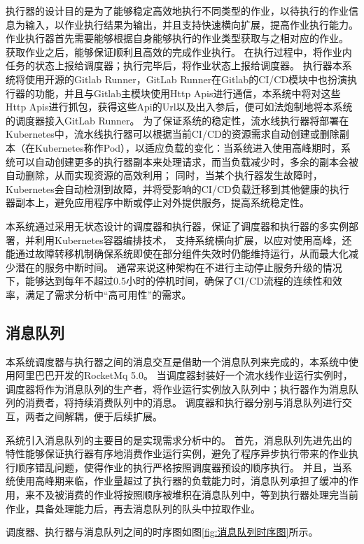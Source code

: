 执行器的设计目的是为了能够稳定高效地执行不同类型的作业，以待执行的作业信息为输入，以作业执行结果为输出，并且支持快速横向扩展，提高作业执行能力。
作业执行器首先需要能够根据自身能够执行的作业类型获取与之相对应的作业。
获取作业之后，能够保证顺利且高效的完成作业执行。
在执行过程中，将作业内任务的状态上报给调度器；执行完毕后，将作业状态上报给调度器。
执行器本系统将使用开源的Gitlab Runner，GitLab Runner在Gitlab的CI/CD模块中也扮演执行器的功能，并且与Gitlab主模块使用Http Apis进行通信，本系统中将对这些Http Apis进行抓包，获得这些Api的Url以及出入参后，便可如法炮制地将本系统的调度器接入GitLab Runner。
为了保证系统的稳定性，流水线执行器将部署在Kubernetes中，流水线执行器可以根据当前CI/CD的资源需求自动创建或删除副本（在Kubernetes称作Pod），以适应负载的变化：当系统进入使用高峰期时，系统可以自动创建更多的执行器副本来处理请求，而当负载减少时，多余的副本会被自动删除，从而实现资源的高效利用；
同时，当某个执行器发生故障时，Kubernetes会自动检测到故障，并将受影响的CI/CD负载迁移到其他健康的执行器副本上，避免应用程序中断或停止对外提供服务，提高系统稳定性。

本系统通过采用无状态设计的调度器和执行器，保证了调度器和执行器的多实例部署，并利用Kubernetes容器编排技术，
支持系统横向扩展，以应对使用高峰，还能通过故障转移机制确保系统即使在部分组件失效时仍能维持运行，从而最大化减少潜在的服务中断时间。
通常来说这种架构在不进行主动停止服务升级的情况下，能够达到每年不超过0.5小时的停机时间，确保了CI/CD流程的连续性和效率，满足了需求分析中“高可用性”的需求。

\subsection{消息队列}

本系统调度器与执行器之间的消息交互是借助一个消息队列来完成的，本系统中使用阿里巴巴开发的RocketMq 5.0。
当调度器封装好一个流水线作业运行实例时，调度器将作为消息队列的生产者，将作业运行实例放入队列中；执行器作为消息队列的消费者，将持续消费队列中的消息。
调度器和执行器分别与消息队列进行交互，两者之间解耦，便于后续扩展。

系统引入消息队列的主要目的是实现需求分析中的。
首先，消息队列先进先出的特性能够保证执行器有序地消费作业运行实例，避免了程序异步执行带来的作业执行顺序错乱问题，使得作业的执行严格按照调度器预设的顺序执行。
并且，当系统使用高峰期来临，作业量超过了执行器的负载能力时，消息队列承担了缓冲的作用，来不及被消费的作业将按照顺序被堆积在消息队列中，等到执行器处理完当前作业，具备处理能力后，再去消息队列的队头中拉取作业。

调度器、执行器与消息队列之间的时序图如图\ref{fig:消息队列时序图}所示。

